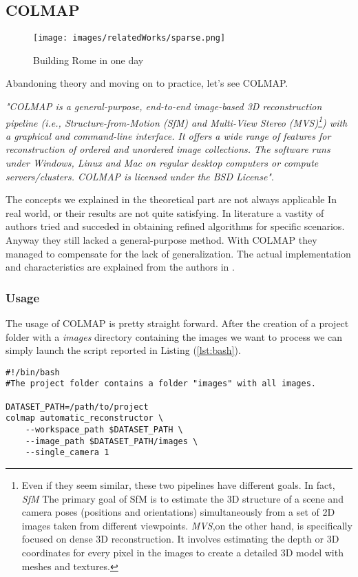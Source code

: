 \subsection{COLMAP}\label{sec:col}
\begin{figure}
    \centering
    \texttt{[image: images/relatedWorks/sparse.png]} %
    \caption{Building Rome in one day}\label{fig:colmap_image}
\end{figure}
Abandoning theory and moving on to practice, let's see COLMAP.

\textit{"COLMAP is a general-purpose, end-to-end image-based 
3D reconstruction pipeline (i.e., Structure-from-Motion (SfM)
 and Multi-View Stereo (MVS)\footnote{Even if they seem similar, these
 two pipelines have different goals. In fact, \textit{SfM} The
  primary goal of SfM is to estimate the 3D structure of 
  a scene and camera poses (positions and orientations) 
  simultaneously from a set of 2D images taken from different
   viewpoints. \textit{MVS},on the other hand, is specifically focused on dense 3D reconstruction. It involves estimating the depth or 3D coordinates 
   for every pixel in the images to create a detailed 3D model with
   meshes and textures.
}) with a graphical and command-line 
 interface. It offers a wide range of features for 
 reconstruction of ordered and unordered image collections. 
 The software runs under Windows, Linux and Mac on regular
  desktop computers or compute servers/clusters. COLMAP is
   licensed under the BSD License"}\cite{colmap}.

The concepts we explained in the theoretical part are not always applicable In
real world, or their results are not quite satisfying. In literature a vastity of authors
tried and succeded in obtaining refined algorithms for specific scenarios. 
Anyway they still lacked a general-purpose method. With COLMAP they managed
to compensate for the lack of generalization. The actual implementation and characteristics
are explained from the authors in \cite{schoenberger2016sfm,schoenberger2016mvs}.

\subsubsection{Usage}
The usage of COLMAP is pretty straight forward. After the creation of a project
folder with a \textit{images} directory containing the images we want to process we 
can simply launch the script reported in Listing (\ref{lst:bash}).
\begin{lstlisting}[style=vscode, caption={Automatic COLMAP Reconstruction}, label={lst:bash}]
#!/bin/bash
#The project folder contains a folder "images" with all images.

DATASET_PATH=/path/to/project
colmap automatic_reconstructor \
    --workspace_path $DATASET_PATH \
    --image_path $DATASET_PATH/images \
    --single_camera 1
    \end{lstlisting}

